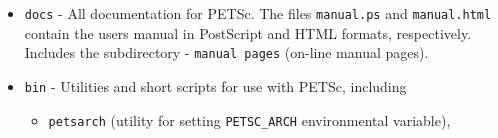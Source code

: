 \begin{itemize}
\item {\tt docs} - All documentation for PETSc. The files {\tt manual.ps}
                   and {\tt manual.html} contain the users manual in
                   PostScript and HTML formats, respectively. Includes
                   the subdirectory
 \subitem - {\tt manual pages} (on-line manual pages).
\item {\tt bin} - Utilities and short scripts for use with PETSc, including
 \begin{itemize}
 \item {\tt petsarch} (utility for setting {\tt PETSC\_ARCH} environmental variable),
 \end{itemize}


\end{itemize}
